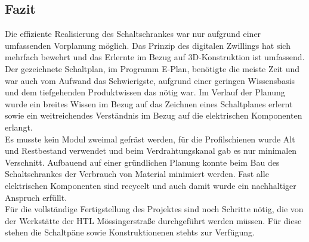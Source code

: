 \subsection{Fazit}\mbox{}
    Die effiziente Realisierung des Schaltschrankes war nur aufgrund einer umfassenden Vorplanung möglich. Das Prinzip des digitalen Zwillings hat sich mehrfach bewehrt und das Erlernte im Bezug auf 3D-Konstruktion ist umfassend.\\
    Der gezeichnete Schaltplan, im Programm E-Plan, benötigte die meiste Zeit und war auch vom Aufwand das Schwierigste, aufgrund einer geringen Wissensbasis und dem tiefgehenden Produktwissen das nötig war. Im Verlauf der Planung wurde ein breites Wissen im Bezug auf das Zeichnen eines Schaltplanes erlernt sowie ein weitreichendes Verständnis im Bezug auf die elektrischen Komponenten erlangt.\\
    Es musste kein Modul zweimal gefräst werden, für die Profilschienen wurde Alt und Restbestand verwendet und beim Verdrahtungskanal gab es nur minimalen Verschnitt. Aufbauend auf einer gründlichen Planung konnte beim Bau des Schaltschrankes der Verbrauch von Material minimiert werden. Fast alle elektrischen Komponenten sind recycelt und auch damit wurde ein nachhaltiger Anspruch erfüllt.\\
    Für die vollständige Fertigstellung des Projektes sind noch Schritte nötig, die von der Werkstätte der HTL Mössingerstraße durchgeführt werden müssen. Für diese stehen die Schaltpäne sowie Konstruktionenen stehts zur Verfügung.\\ 



